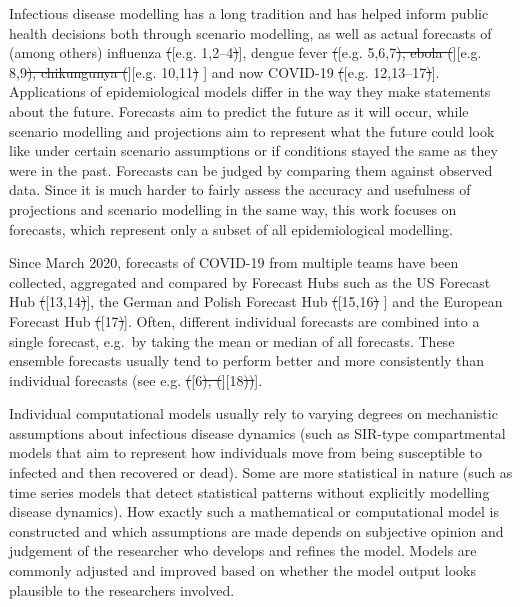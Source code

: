 \documentclass[10pt,letterpaper]{article} %
\providecommand{\DIFaddtex}[1]{{\protect\color{blue}\uwave{#1}}} %
\providecommand{\DIFdeltex}[1]{{\protect\color{red}\sout{#1}}}                      %
\providecommand{\DIFaddbegin}{} %
\providecommand{\DIFaddend}{} %
\providecommand{\DIFdelbegin}{} %
\providecommand{\DIFdelend}{} %
\providecommand{\DIFadd}[1]{\texorpdfstring{\DIFaddtex{#1}}{#1}} %
\providecommand{\DIFdel}[1]{\texorpdfstring{\DIFdeltex{#1}}{}} %
\newcommand{\DIFscaledelfig}{0.5}
\newlength{\DIFdelgraphicswidth} %
\newlength{\DIFdelgraphicsheight} %
\newcommand{\DIFaddincludegraphics}[2][]{{\color{blue}\fbox{\DIFOincludegraphics[#1]{#2}}}} %
\newcommand{\DIFdelincludegraphics}[2][]{%
\sbox{\DIFdelgraphicsbox}{\DIFOincludegraphics[#1]{#2}}%
\settoboxwidth{\DIFdelgraphicswidth}{\DIFdelgraphicsbox} %
\settoboxtotalheight{\DIFdelgraphicsheight}{\DIFdelgraphicsbox} %
\scalebox{\DIFscaledelfig}{%
\parbox[b]{\DIFdelgraphicswidth}{\usebox{\DIFdelgraphicsbox}\\[-\baselineskip] \rule{\DIFdelgraphicswidth}{0em}}\llap{\resizebox{\DIFdelgraphicswidth}{\DIFdelgraphicsheight}{%
\setlength{\unitlength}{\DIFdelgraphicswidth}%
\begin{picture}(1,1)%
\thicklines\linethickness{2pt} %
{\color[rgb]{1,0,0}\put(0,0){\framebox(1,1){}}}%
{\color[rgb]{1,0,0}\put(0,0){\line( 1,1){1}}}%
{\color[rgb]{1,0,0}\put(0,1){\line(1,-1){1}}}%
\end{picture}%
}\hspace*{3pt}}} %
} %
\DeclareRobustCommand{\DIFaddbegin}{\DIFOaddbegin \let\includegraphics\DIFaddincludegraphics} %
\DeclareRobustCommand{\DIFaddend}{\DIFOaddend \let\includegraphics\DIFOincludegraphics} %
\DeclareRobustCommand{\DIFdelbegin}{\DIFOdelbegin \let\includegraphics\DIFdelincludegraphics} %
\DeclareRobustCommand{\DIFdelend}{\DIFOaddend \let\includegraphics\DIFOincludegraphics} %
\begin{document}
Infectious disease modelling has a long tradition and has helped inform
public health decisions both through scenario modelling, as well as
actual forecasts of (among others) influenza \DIFdelbegin \DIFdel{(}\DIFdelend \DIFaddbegin {[}\DIFaddend e.g. 1,2--4\DIFdelbegin \DIFdel{)}\DIFdelend \DIFaddbegin {]}\DIFaddend , dengue
fever \DIFdelbegin \DIFdel{(}\DIFdelend \DIFaddbegin {[}\DIFaddend e.g. 5,6,7\DIFdelbegin \DIFdel{), ebola (}\DIFdelend \DIFaddbegin {]}\DIFadd{, ebola }{[}\DIFaddend e.g. 8,9\DIFdelbegin \DIFdel{), chikungunya (}\DIFdelend \DIFaddbegin {]}\DIFadd{, chikungunya }{[}\DIFaddend e.g.
10,11\DIFdelbegin \DIFdel{) }\DIFdelend \DIFaddbegin {]} \DIFaddend and now COVID-19 \DIFdelbegin \DIFdel{(}\DIFdelend \DIFaddbegin {[}\DIFaddend e.g. 12,13--17\DIFdelbegin \DIFdel{)}\DIFdelend \DIFaddbegin {]}\DIFaddend . Applications of
epidemiological models differ in the way they make statements about the
future. Forecasts aim to predict the future as it will occur, while
scenario modelling and projections aim to represent what the future
could look like under certain scenario assumptions or if conditions
stayed the same as they were in the past. Forecasts can be judged by
comparing them against observed data. Since it is much harder to fairly
assess the accuracy and usefulness of projections and scenario modelling
in the same way, this work focuses on forecasts, which represent only a
subset of all epidemiological modelling.

Since March 2020, forecasts of COVID-19 from multiple teams have been
collected, aggregated and compared by Forecast Hubs such as the US
Forecast Hub \DIFdelbegin \DIFdel{(}\DIFdelend \DIFaddbegin {[}\DIFaddend 13,14\DIFdelbegin \DIFdel{)}\DIFdelend \DIFaddbegin {]}\DIFaddend , the German and Polish Forecast Hub \DIFdelbegin \DIFdel{(}\DIFdelend \DIFaddbegin {[}\DIFaddend 15,16\DIFdelbegin \DIFdel{) }\DIFdelend \DIFaddbegin {]}
\DIFaddend and the European Forecast Hub \DIFdelbegin \DIFdel{(}\DIFdelend \DIFaddbegin {[}\DIFaddend 17\DIFdelbegin \DIFdel{)}\DIFdelend \DIFaddbegin {]}\DIFaddend . Often, different individual
forecasts are combined into a single forecast, e.g.~by taking the mean
or median of all forecasts. These ensemble forecasts usually tend to
perform better and more consistently than individual forecasts (see e.g.
\DIFdelbegin \DIFdel{(}\DIFdelend \DIFaddbegin {[}\DIFaddend 6\DIFdelbegin \DIFdel{); (}\DIFdelend \DIFaddbegin {]}\DIFadd{; }{[}\DIFaddend 18\DIFdelbegin \DIFdel{))}\DIFdelend \DIFaddbegin {]}\DIFadd{)}\DIFaddend .

Individual computational models usually rely to varying degrees on
mechanistic assumptions about infectious disease dynamics (such as
SIR-type compartmental models that aim to represent how individuals move
from being susceptible to infected and then recovered or dead). Some are
more statistical in nature (such as time series models that detect
statistical patterns without explicitly modelling disease dynamics). How
exactly such a mathematical or computational model is constructed and
which assumptions are made depends on subjective opinion and judgement
of the researcher who develops and refines the model. Models are
commonly adjusted and improved based on whether the model output looks
plausible to the researchers involved.
\end{document}
